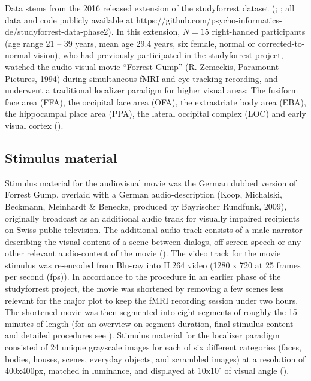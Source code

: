 \documentclass[a4paper, 12pt]{scrreprt}
\begin{document}
Data stems from the 2016 released extension of the studyforrest dataset (\cite{hanke2016studyforrest}; \cite{sengupta2016studyforrest}; all data and code publicly available at https://github.com/psycho-informatics-de/studyforrest-data-phase2). In this extension, $N = 15$ right-handed participants (age range 21 – 39 years, mean age 29.4 years, six female, normal or corrected-to-normal vision), who had previously participated in the studyforrest project, watched the audio-visual movie “Forrest Gump” (R. Zemeckis, Paramount Pictures, 1994) during simultaneous fMRI and eye-tracking recording, and underwent a traditional localizer paradigm for higher visual areas: The fusiform face area (FFA), the occipital face area (OFA), the extrastriate body area (EBA), the hippocampal place area (PPA), the lateral occipital complex (LOC) and early visual cortex (\cite{sengupta2016studyforrest}).

\subsection{Stimulus material}

Stimulus material for the audiovisual movie was the German dubbed version of Forrest Gump, overlaid with a German audio-description (Koop, Michalski, Beckmann, Meinhardt \& Benecke, produced by Bayrischer Rundfunk, 2009), originally broadcast as an additional audio track for visually impaired recipients on Swiss public television. The additional audio track consists of a male narrator describing the visual content of a scene between dialogs, off-screen-speech or any other relevant audio-content of the movie (\cite{hanke2014high}). The video track for the movie stimulus was re-encoded from Blu-ray into H.264 video (1280 x 720 at 25 frames per second (fps)). In accordance to the procedure in an earlier phase of the studyforrest project, the movie was shortened by removing a few scenes less relevant for the major plot to keep the fMRI recording session under two hours. The shortened movie was then segmented into eight segments of roughly the 15 minutes of length (for an overview on segment duration, final stimulus content and detailed procedures see \textcite{hanke2014high}). Stimulus material for the localizer paradigm consisted of 24 unique grayscale images for each of six different categories (faces, bodies, houses, scenes, everyday objects, and scrambled images) at a resolution of 400x400px, matched in luminance, and displayed at 10x10$^\circ$ of visual angle (\cite{sengupta2016studyforrest}).
\end{document}
